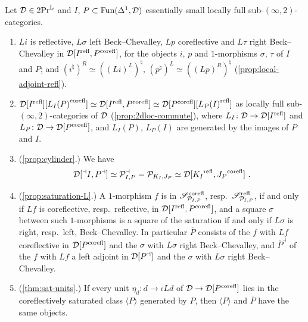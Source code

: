 \begin{cor}
\label{cor:presentable}
%
Let $\mathcal{D} \in \operatorname{2Pr}^{\operatorname{L}}$ and $I$,
$P \subset \operatorname{Fun}(\Delta^{1},\mathcal{D})$
essentially small locally full sub-$(\infty,2)$-categories.
\begin{enumerate}
\item $Li$ is reflective, $L\sigma$ left Beck--Chevalley,
$Lp$ coreflective and $L\tau$ right Beck--Chevalley in $\mathcal{D}[{I}^{\mathrm{refl}},{P}^{\mathrm{corefl}}]$,
for the objects $i$, $p$ and $1$-morphisms $\sigma$, $\tau$ of $I$ and $P$; and
$(i^{\natural})^{R} \simeq ((Li)^{L})^{\natural}$,
$(p^{\natural})^{L} \simeq ((Lp)^{R})^{\natural}$
(\cref{prop:local-adjoint-refl}).
\item
$\mathcal{D}[{I}^{\mathrm{refl}}][{L_{I}(P)}^{\mathrm{corefl}}] \simeq \mathcal{D}[{I}^{\mathrm{refl}},{P}^{\mathrm{corefl}}] \simeq
\mathcal{D}[{P}^{\mathrm{corefl}}][{L_{P}(I)}^{\mathrm{refl}}]$
as locally full sub-$(\infty,2)$-categories of $\mathcal{D}$ (\cref{prop:2dloc-commute}),
where
$L_{I}\colon \mathcal{D} \to \mathcal{D}[{I}^{\mathrm{refl}}]$
and
$L_{P}\colon \mathcal{D} \to \mathcal{D}[{P}^{\mathrm{corefl}}]$,
and $L_{I}(P)$, $L_{P}(I)$ are generated by the images of $P$ and $I$.
\item (\cref{prop:cylinder}.) We have
\begin{equation*}
\mathcal{D}[{}^{\dashv}{I},{P}^{\dashv}] \simeq \mathcal{P}^{\dashv}_{I,P} = \mathcal{P}_{K_{I},J_{P}} \simeq
\mathcal{D}[{K_{I}}^{\mathrm{refl}},{J_{P}}^{\mathrm{corefl}}] \ .
\end{equation*}
\item (\cref{prop:saturation-L}.) A $1$-morphism $f$ is in
$\mathscr{S}^{\mathrm{corefl}}_{\mathcal{P}_{I,P}}$,
resp.\
$\mathscr{S}^{\mathrm{refl}}_{\mathcal{P}_{I,P}}$,
if and only if $Lf$ is coreflective, resp.\ reflective, in $\mathcal{D}[{I}^{\mathrm{refl}},{P}^{\mathrm{corefl}}]$,
and a square $\sigma$ between such $1$-morphisms is a square of the saturation
if and only if $L\sigma$ is right, resp.\ left, Beck--Chevalley.
In particular $\overline{P}$ consists of the $f$ with $Lf$ coreflective in
$\mathcal{D}[{P}^{\mathrm{corefl}}]$ and the $\sigma$ with $L\sigma$ right Beck--Chevalley, and
$\overline{P}^{\dashv}$
of the $f$ with $Lf$ a left adjoint in $\mathcal{D}[{P}^{\dashv}]$ and the $\sigma$ with
$L\sigma$ right Beck--Chevalley.
\item (\cref{thm:sat-units}.) If every unit
$\eta_{d}\colon d \to \iota L d$
of $\mathcal{D} \to \mathcal{D}[{P}^{\mathrm{corefl}}]$ lies in the coreflectively saturated class $\langle P
\rangle$ generated by $P$, then $\langle P \rangle$ and $\overline{P}$ have the
same objects.
\end{enumerate}
\end{cor}

